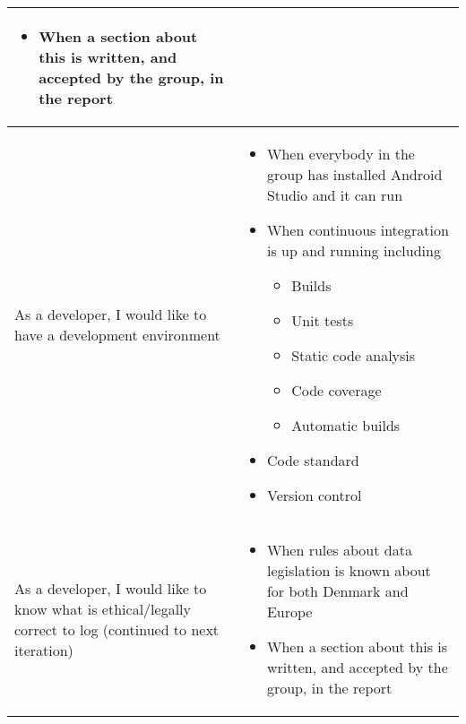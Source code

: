 \begin{center}
\begin{longtable}{| m{} | m{} |}
\begin{itemize}[noitemsep,topsep=0pt,parsep=0pt,partopsep=0pt]
		\item When a section about this is written, and accepted by the group, in the report
	\end{itemize} \\ \hline
	As a developer, I would like to have a development environment & 
	\begin{itemize}[noitemsep,topsep=0pt,parsep=0pt,partopsep=0pt]
		\item When everybody in the group has installed Android Studio and it can run
		\item When continuous integration is up and running including 
			\begin{itemize}[noitemsep,topsep=0pt,parsep=0pt,partopsep=0pt]
				\item Builds
				\item Unit tests
				\item Static code analysis
				\item Code coverage
				\item Automatic builds
			\end{itemize}
		\item Code standard
		\item Version control
	\end{itemize} \\ \hline
	As a developer, I would like to know what is ethical/legally correct to log (continued to next iteration) & 
	\begin{itemize}[noitemsep,topsep=0pt,parsep=0pt,partopsep=0pt]
		\item When rules about data legislation is known about for both Denmark and Europe
		\item When a section about this is written, and accepted by the group, in the report
	\end{itemize} \\ \hline
	

\end{longtable}
\end{center}
